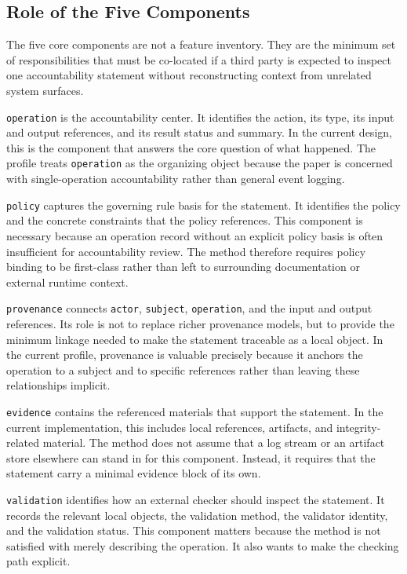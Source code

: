 \subsection{Role of the Five Components}

The five core components are not a feature inventory. They are the minimum set of responsibilities that must be co-located if a third party is expected to inspect one accountability statement without reconstructing context from unrelated system surfaces.

\texttt{operation} is the accountability center. It identifies the action, its type, its input and output references, and its result status and summary. In the current design, this is the component that answers the core question of what happened. The profile treats \texttt{operation} as the organizing object because the paper is concerned with single-operation accountability rather than general event logging.

\texttt{policy} captures the governing rule basis for the statement. It identifies the policy and the concrete constraints that the policy references. This component is necessary because an operation record without an explicit policy basis is often insufficient for accountability review. The method therefore requires policy binding to be first-class rather than left to surrounding documentation or external runtime context.

\texttt{provenance} connects \texttt{actor}, \texttt{subject}, \texttt{operation}, and the input and output references. Its role is not to replace richer provenance models, but to provide the minimum linkage needed to make the statement traceable as a local object. In the current profile, provenance is valuable precisely because it anchors the operation to a subject and to specific references rather than leaving these relationships implicit.

\texttt{evidence} contains the referenced materials that support the statement. In the current implementation, this includes local references, artifacts, and integrity-related material. The method does not assume that a log stream or an artifact store elsewhere can stand in for this component. Instead, it requires that the statement carry a minimal evidence block of its own.

\texttt{validation} identifies how an external checker should inspect the statement. It records the relevant local objects, the validation method, the validator identity, and the validation status. This component matters because the method is not satisfied with merely describing the operation. It also wants to make the checking path explicit.

